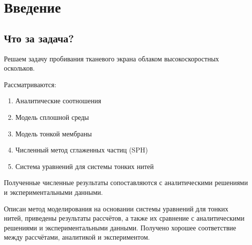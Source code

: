\chapter{Введение}\label{ch:intro}

\section*{Что за задача?}

Решаем задачу пробивания тканевого экрана облаком высокоскоростных оскольков.

Рассматриваются:

\begin{enumerate}
    \item Аналитические соотношения
    \item Модель сплошной среды
    \item Модель тонкой мембраны
    \item Численный метод сглаженных частиц (SPH)
    \item Система уравнений для системы тонких нитей
\end{enumerate}

Полученные численные результаты сопоставляются с аналитическими решениями и экспериментальными данными.

Описан метод моделирования на основании системы уравнений для тонких нитей,
приведены результаты рассчётов, а также  их сравнение с аналитическими решениями и экспериментальными данными.
Получено хорошее соответствие между рассчётами, аналитикой и экспериментом.
